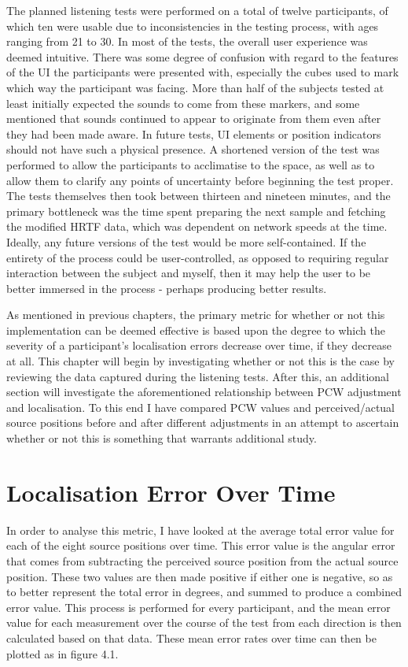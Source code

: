 The planned listening tests were performed on a total of twelve participants, of which ten were usable due to inconsistencies in the testing process, with ages ranging from 21 to 30. In most of the tests, the overall user experience was deemed intuitive. There was some degree of confusion with regard to the features of the UI the participants were presented with, especially the cubes used to mark which way the participant was facing. More than half of the subjects tested at least initially expected the sounds to come from these markers, and some mentioned that sounds continued to appear to originate from them even after they had been made aware. In future tests, UI elements or position indicators should not have such a physical presence. A shortened version of the test was performed to allow the participants to acclimatise to the space, as well as to allow them to clarify any points of uncertainty before beginning the test proper. The tests themselves then took between thirteen and nineteen minutes, and the primary bottleneck was the time spent preparing the next sample and fetching the modified HRTF data, which was dependent on network speeds at the time. Ideally, any future versions of the test would be more self-contained. If the entirety of the process could be user-controlled, as opposed to requiring regular interaction between the subject and myself, then it may help the user to be better immersed in the process - perhaps producing better results. 

As mentioned in previous chapters, the primary metric for whether or not this implementation can be deemed effective is based upon the degree to which the severity of a participant's localisation errors decrease over time, if they decrease at all. This chapter will begin by investigating whether or not this is the case by reviewing the data captured during the listening tests. After this, an additional section will investigate the aforementioned relationship between PCW adjustment and localisation. To this end I have compared PCW values and perceived/actual source positions before and after different adjustments in an attempt to ascertain whether or not this is something that warrants additional study.	

\section{Localisation Error Over Time}
In order to analyse this metric, I have looked at the average total error value for each of the eight source positions over time. This error value is the angular error that comes from subtracting the perceived source position from the actual source position. These two values are then made positive if either one is negative, so as to better represent the total error in degrees, and summed to produce a combined error value. This process is performed for every participant, and the mean error value for each measurement over the course of the test from each direction is then calculated based on that data. These mean error rates over time can then be plotted as in figure 4.1. 

